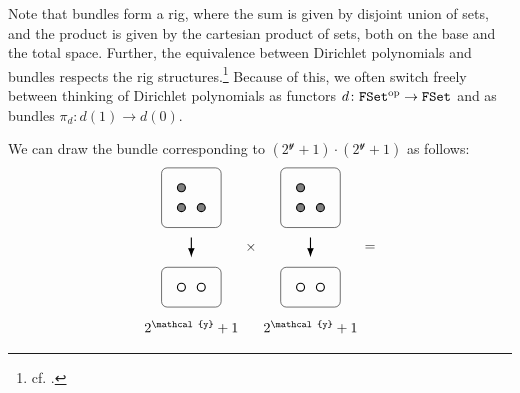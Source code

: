 \documentclass[11pt,fleqn]{article}
\newcommand{\yon}{\mathcal{y}}
\newcommand{\op}{^\textnormal{op}}
\newcommand{\cat}[1]{\mathtt{#1}}
\newcommand{\FSet}{\cat{FSet}}
\begin{document}
Note that bundles form a rig, where the sum is given by disjoint union of sets, and the product is given by the cartesian product of sets, both on the base and the total space.
Further, the equivalence between Dirichlet polynomials and bundles respects the rig structures.\footnote{cf. \cite[Theorem~4.6]{SM2020}.}
Because of this, we often switch freely between thinking of Dirichlet polynomials as functors $d\colon\FSet\op\to\FSet$ and as bundles $\pi_d\colon d(1)\to d(0)$.

\begin{example}
  We can draw the bundle corresponding to $(2^\yon+1)\cdot(2^\yon+1)$ as follows:
  \[
    \begin{tikzpicture}[scale=0.5]
      \begin{scope}
        \begin{scope}
          \draw[rounded corners] (0,0) rectangle ++(3,3);
          \draw[thick,black,fill=gray] (1,1) circle (2mm);
          \draw[thick,black,fill=gray] (1,2) circle (2mm);
          \draw[thick,black,fill=gray] (2,1) circle (2mm);
        \end{scope}
        \draw[thick,-Latex] (1.5,-0.5) to (1.5,-1.5);
        \begin{scope}[shift={(0,-4)}]
          \draw[rounded corners] (0,0) rectangle ++(3,2);
          \draw[thick,black,fill=white] (1,1) circle (2mm);
          \draw[thick,black,fill=white] (2,1) circle (2mm);
        \end{scope}
        \node at (1.5,-5) {$2^\yon+1$};
      \end{scope}
      \node at (4.5,-1) {$\times$};
      \begin{scope}[shift={(6,0)}]
        \begin{scope}
          \draw[rounded corners] (0,0) rectangle ++(3,3);
          \draw[thick,black,fill=gray] (1,1) circle (2mm);
          \draw[thick,black,fill=gray] (1,2) circle (2mm);
          \draw[thick,black,fill=gray] (2,1) circle (2mm);
        \end{scope}
        \draw[thick,-Latex] (1.5,-0.5) to (1.5,-1.5);
        \begin{scope}[shift={(0,-4)}]
          \draw[rounded corners] (0,0) rectangle ++(3,2);
          \draw[thick,black,fill=white] (1,1) circle (2mm);
          \draw[thick,black,fill=white] (2,1) circle (2mm);
        \end{scope}
        \node at (1.5,-5) {$2^\yon+1$};
      \end{scope}
      \node at (10.5,-1) {$=$};
      \begin{scope}[shift={(12,0)}]

\end{scope}
\end{tikzpicture}\]
\end{example}
\end{document}
